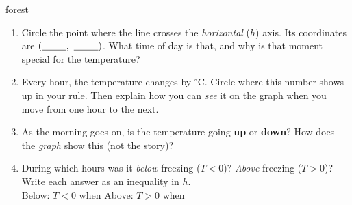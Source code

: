 \documentclass[12pt]{article}
\newcommand{\answerspace}[2]{\par\nopagebreak\noindent\begin{minipage}[t][#1][t]{\linewidth}%
  \color{keyred}\bfseries #2\end{minipage}\par}
\begin{document}
\begin{scenariobox}{forest}
\begin{enumerate}[label=\textbf{\alph*.}, start=4, leftmargin=1.8em, itemsep=8pt]
  \item Circle the point where the line crosses the \emph{horizontal} ($h$) axis. Its coordinates
        are $(\blank{0.9cm},\ \blank{0.9cm})$. What time of day is that, and why is that moment
        special for the temperature?
        \answerspace{2.0cm}{}
  \item Every hour, the temperature changes by \blank{1.4cm} $^\circ$C. Circle where this number
        shows up in your rule. Then explain how you can \emph{see} it on the graph when you move
        from one hour to the next.
        \answerspace{2.0cm}{}
  \item As the morning goes on, is the temperature going \textbf{up} or \textbf{down}? How does
        the \emph{graph} show this (not the story)?
        \answerspace{2.0cm}{}
  \item During which hours was it \emph{below} freezing ($T<0$)? \emph{Above} freezing ($T>0$)?
        Write each answer as an inequality in $h$.
        \\[6pt]
        Below: $T<0$ when \blank{3.6cm} \qquad Above: $T>0$ when \blank{3.6cm}
\end{enumerate}
\end{scenariobox}
\end{document}
